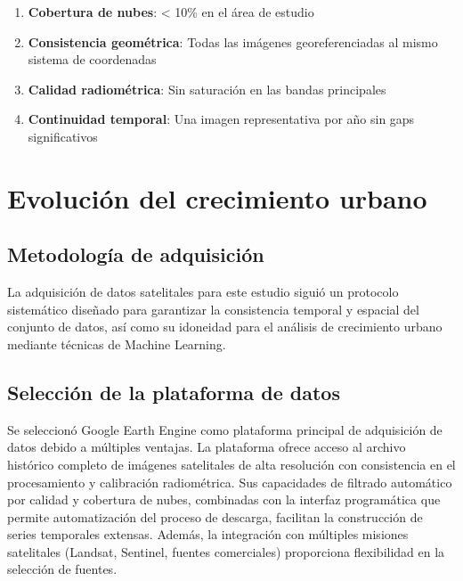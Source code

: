 \begin{enumerate}
	\item \textbf{Cobertura de nubes}: < 10\% en el área de estudio
	\item \textbf{Consistencia geométrica}: Todas las imágenes georeferenciadas al mismo sistema de coordenadas
	\item \textbf{Calidad radiométrica}: Sin saturación en las bandas principales
	\item \textbf{Continuidad temporal}: Una imagen representativa por año sin gaps significativos
\end{enumerate}

\section{Evolución del crecimiento urbano}


\subsection{Metodología de adquisición}

La adquisición de datos satelitales para este estudio siguió un protocolo sistemático diseñado para garantizar la consistencia temporal y espacial del conjunto de datos, así como su idoneidad para el análisis de crecimiento urbano mediante técnicas de Machine Learning.

\subsection{Selección de la plataforma de datos}

Se seleccionó Google Earth Engine como plataforma principal de adquisición de datos debido a múltiples ventajas. La plataforma ofrece acceso al archivo histórico completo de imágenes satelitales de alta resolución con consistencia en el procesamiento y calibración radiométrica. Sus capacidades de filtrado automático por calidad y cobertura de nubes, combinadas con la interfaz programática que permite automatización del proceso de descarga, facilitan la construcción de series temporales extensas. Además, la integración con múltiples misiones satelitales (Landsat, Sentinel, fuentes comerciales) proporciona flexibilidad en la selección de fuentes.

